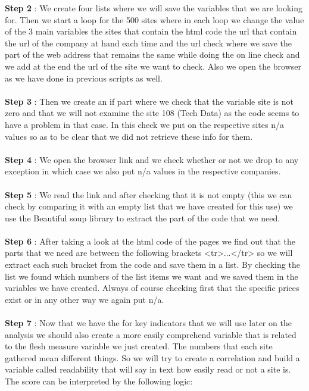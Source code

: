 \documentclass{article}
\begin{document}
\textbf{Step 2} : We create four lists where we will save the variables that we are looking for. Then we start a loop for the 500 sites where in each loop we change the value of the 3 main variables the sites that contain the html code the url that contain the url of the company at hand each time and the url check where we save the part of the web address that remains the same while doing the on line check and we add at the end the url of the site we want to check. Also we open the browser as we have done in previous scripts as well.\\\\
\textbf{Step 3} : Then we create an if part where we check that the variable site is not zero and that we will not examine the site 108 (Tech Data) as the code seems to have a problem in that case. In this check we put on the respective sites n/a values so as to be clear that we did not retrieve these info for them.\\\\
\textbf{Step 4} : We open the browser link and we check whether or not we drop to any exception in which case we also put n/a values in the respective companies.\\\\
\textbf{Step 5} : We read the link and after checking that it is not empty (this we  can check by comparing it with an empty list that we have created for this use) we use the Beautiful soup library to extract the part of the code that we need.\\\\
\textbf{Step 6} : After taking a look at the html code of the pages we find out that the parts that we need are between the following brackets <tr>...</tr> so we will extract each such bracket from the code and save them in a list. By checking the list we found which numbers of the list items we want and we saved them in the variables we have created. Always of course checking first that the specific prices exist or in any other way we again put n/a.\\\\
\textbf{Step 7} : Now that we have the for key indicators that we will use later on the analysis we should also create a more easily comprehend variable that is related to the flesh measure variable we just created. The numbers that each site gathered mean different things. So we will try to create a correlation and build a variable called readability that will say in text how easily read or not a site is. The score can be interpreted by the following logic:
\end{document}

